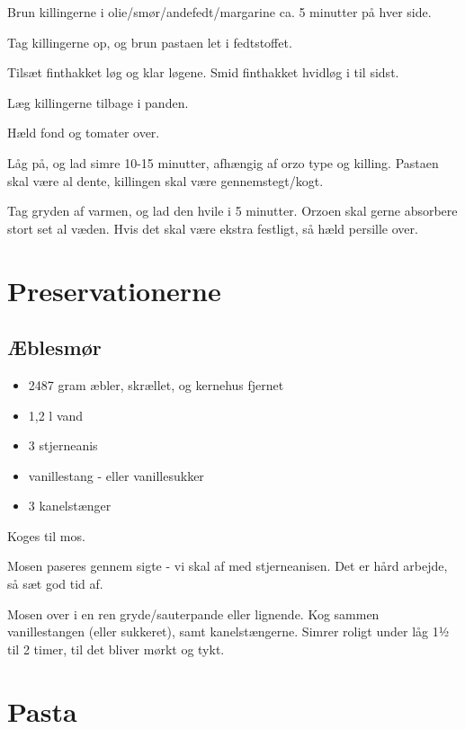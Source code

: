 \documentclass[
]{book}
\providecommand{\tightlist}{%
  \setlength{\itemsep}{0pt}\setlength{\parskip}{0pt}}
\begin{document}
Brun killingerne i olie/smør/andefedt/margarine
ca. 5 minutter på hver side.

Tag killingerne op, og brun pastaen let i fedtstoffet.

Tilsæt finthakket løg og klar løgene. Smid finthakket hvidløg i til sidst.

Læg killingerne tilbage i panden.

Hæld fond og tomater over.

Låg på, og lad simre 10-15 minutter, afhængig af orzo type og killing.
Pastaen skal være al dente, killingen skal være gennemstegt/kogt.

Tag gryden af varmen, og lad den hvile i 5 minutter. Orzoen skal gerne absorbere
stort set al væden. Hvis det skal være ekstra festligt, så hæld persille over.

\hypertarget{preservationerne}{%
\chapter{Preservationerne}\label{preservationerne}}

\hypertarget{uxe6blesmuxf8r}{%
\section{Æblesmør}\label{uxe6blesmuxf8r}}

\begin{itemize}
\tightlist
\item
  2487 gram æbler, skrællet, og kernehus fjernet
\item
  1,2 l vand
\item
  3 stjerneanis
\item
  vanillestang - eller vanillesukker
\item
  3 kanelstænger
\end{itemize}

Koges til mos.

Mosen paseres gennem sigte - vi skal af med stjerneanisen.
Det er hård arbejde, så sæt god tid af.

Mosen over i en ren gryde/sauterpande eller lignende.
Kog sammen vanillestangen (eller sukkeret), samt kanelstængerne.
Simrer roligt under låg 1½ til 2 timer, til det bliver mørkt og tykt.

\hypertarget{pasta}{%
\chapter{Pasta}\label{pasta}}
\end{document}
